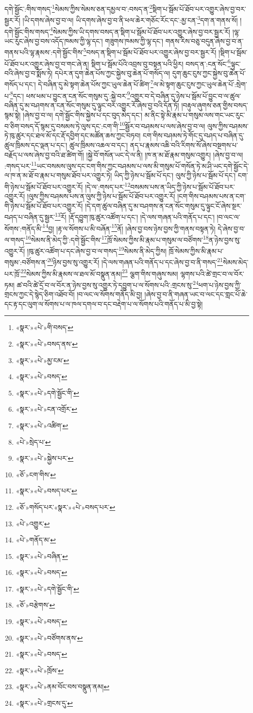 དགེ་སྦྱོང་:གིས་གསད་\footnote{«སྣར་»«པེ་»གི་བསད་}སེམས་ཀྱིས་སེམས་ཅན་དམྱལ་བ་:བསད་ན་\footnote{«སྣར་»«པེ་»བསད་ནས་}སྡིག་པ་སྦོམ་པོ་ཐོབ་པར་འགྱུར་ཞེས་བྱ་བར་སྦྱར་རོ། །ཡི་དགས་ཞེས་བྱ་བ་ལ། ཡི་དགས་ཞེས་བྱ་བ་ནི་ཕལ་ཆེར་གཅོང་རོང་དང་:མྱ་ངན་\footnote{«སྣར་»«པེ་»མྱ་ངམ་}དག་ན་གནས་སོ། །དགེ་སྦྱོང་གིས་གསད་\footnote{«སྣར་»«པེ་»བསད་}སེམས་ཀྱིས་ཡི་དགས་བསད་ན་སྡིག་པ་སྦོམ་པོ་ཐོབ་པར་འགྱུར་ཞེས་བྱ་བར་སྦྱར་རོ། །ལྷ་ཡང་རུང་ཞེས་བྱ་བས་འདོད་ཁམས་ཀྱི་ལྷ་དང་། གཟུགས་ཁམས་ཀྱི་ལྷ་དང་། གནས་རིས་བཅུ་བདུན་ཞེས་བྱ་བ་ན་གནས་པའི་ལྷ་རྣམས་:དགེ་སྦྱོང་གིས་\footnote{«སྣར་»«པེ་»དགེ་སྦྱོང་གི་}བསད་ན་སྡིག་པ་སྦོམ་པོ་ཐོབ་པར་འགྱུར་ཞེས་བྱ་བར་སྦྱར་རོ། །སྡིག་པ་སྦོམ་པོ་ཐོབ་པར་འགྱུར་ཞེས་བྱ་བ་གང་ཞེ་ན། སྡིག་པ་སྦོམ་པོའི་འབྲས་བུ་བསྟན་པའི་ཕྱིར། བསད་ན་:ངན་སོང་\footnote{«སྣར་»«པེ་»ངན་འགྲོར་}ལྟུང་བའི་ཞེས་བྱ་བ་སྨོས་ཏེ། དཔེར་ན་དུག་ཆེན་པོས་ཀྱང་སྐྱེས་བུ་ཆེན་པོ་གསོད་ལ། དུག་ཆུང་ངུས་ཀྱང་སྐྱེས་བུ་ཆེན་པོ་གསོད་པ་དང་། དེ་བཞིན་དུ་མེ་སྟག་ཆེན་པོས་ཀྱང་ཡུལ་ཆེན་པོ་ཚིག་\footnote{«སྣར་»«པེ་»འཚིག་}ལ་མེ་སྟག་ཆུང་ངུས་ཀྱང་ཡུལ་ཆེན་པོ་:སྲེག་པ་\footnote{«པེ་»སྲེད་པ་}དང་། ཕས་ཕམ་པ་བྱུང་ན་ངན་སོང་གསུམ་དུ་:སྐྱེ་བར་\footnote{«སྣར་»«པེ་»སྐྱེས་པར་}འགྱུར་བ་དེ་བཞིན་དུ་ཉེས་པ་སྦོམ་པོ་བྱུང་བ་ལ་ཚུལ་བཞིན་དུ་མ་བཤགས་ན་ངན་སོང་གསུམ་དུ་ལྟུང་བར་འགྱུར་རོ་ཞེས་བྱ་བའི་དོན་ཏོ། །བརྟུལ་ཞུགས་ཅན་གྱིས་བསད་སྙམ་སྟེ། །ཞེས་བྱ་བ་ལ། དགེ་སྦྱོང་གིས་སྐྱེས་པ་དང་བུད་མེད་དང་། མ་ནིང་སྟེ་མི་རྣམ་པ་གསུམ་ལས་གང་ཡང་རུང་བ་ཅིག་བསད་དོ་སྙམ་དུ་བསམས་ཏེ་ལུས་དང་:ངག་གི་\footnote{«ཅོ་»ངག་གིས་}སྦྱོར་བ་བཤམས་པ་ལས་ཞེས་བྱ་བ་ལ། ལུས་ཀྱིས་བཤམས་ཏེ་ཁུ་ཚུར་དང་ཐལ་མོ་དང་རྡོ་དབྱིག་དང་མཚོན་ཆས་ཀྱང་བཏབ། ངག་གིས་བཤམས་ཏེ་གོང་དུ་བཤད་པ་བཞིན་དུ་ཚུལ་ཁྲིམས་དང་ལྡན་པ་དང་། ཚུལ་ཁྲིམས་འཆལ་བ་དང་། ནད་པ་རྣམས་འཆི་བའི་རིགས་སོ་ཞེས་བསྔགས་པ་བརྗོད་པ་ལས་ཞེས་བྱ་བའི་ཐ་ཚིག་གོ། །སྐྱེ་བོ་གསོན་ཡང་དེ་ལ་ནི། །ཁ་ན་མ་ཐོ་རྣམ་གསུམ་འགྱུར། །ཞེས་བྱ་བ་ལ། :གསད་པར་\footnote{«སྣར་»«པེ་»བསད་པར་}ཡང་བསམས་ལུས་དང་ངག་གིས་ཀྱང་བཤམས་པ་ལས་མི་གསུམ་པོ་གསོན་ཏེ་མ་ཤི་ཡང་དགེ་སྦྱོང་དེ་ལ་ཁ་ན་མ་ཐོ་བ་རྣམ་པ་གསུམ་ཐོབ་པར་འགྱུར་ཏེ། ཡིད་ཀྱི་ཉེས་པ་སྦོམ་པོ་དང་། ལུས་ཀྱི་ཉེས་པ་སྦོམ་པོ་དང་། ངག་གི་ཉེས་པ་སྦོམ་པོ་ཐོབ་པར་འགྱུར་རོ། །དེ་ལ་:གསད་པར་\footnote{«ཅོ་»གསོད་པར་«སྣར་»«པེ་»བསད་པར་}བསམས་པས་ན་ཡིད་ཀྱི་ཉེས་པ་སྦོམ་པོ་ཐོབ་པར་འགྱུར་རོ། །ལུས་ཀྱིས་བཤམས་པས་ན་ལུས་ཀྱི་ཉེས་པ་སྦོམ་པོ་ཐོབ་པར་འགྱུར་རོ། །ངག་གིས་བཤམས་པས་ན་ངག་གི་ཉེས་པ་སྦོམ་པོ་ཐོབ་པར་འགྱུར་རོ། །དེ་དག་ཚུལ་བཞིན་དུ་མ་བཤགས་ན་ངན་སོང་གསུམ་དུ་ལྟུང་ངོ་ཞེས་སྔར་བཤད་པ་བཞིན་དུ་སྦྱར་\footnote{«པེ་»འགྱུར་}རོ། །རྡོ་དབྱུག་ཁུ་ཚུར་འཚོག་པ་དང་། །དེ་ལས་གཞན་པའི་གནོད་པ་དང་། །བ་ལང་ལ་སོགས་:གནོད་མི་\footnote{«པེ་»གནོད་མ་}བྱ། །རྟ་ལ་སོགས་པ་མི་བཞོན་\footnote{«སྣར་»«པེ་»བཞིན་}ནོ། །ཞེས་བྱ་བས་ཉེས་བྱས་ཀྱི་གནས་བསྟན་ཏེ། དེ་ཞེས་བྱ་བ་ལ་གསད་\footnote{«སྣར་»«པེ་»བསད་}སེམས་ནི་མེད་ཀྱི་:དགེ་སྦྱོང་གིས་\footnote{«སྣར་»«པེ་»དགེ་སྦྱོང་གི་}ཁྲོ་སེམས་ཀྱིས་མི་རྣམ་པ་གསུམ་ལ་བཙོགས་\footnote{«ཅོ་»བརྩེགས་}ན་ཉེས་བྱས་སུ་འགྱུར་རོ། །ཁུ་ཚུར་འཚོག་པ་དང་ཞེས་བྱ་བ་ལ་གསད་\footnote{«སྣར་»«པེ་»བསད་}སེམས་ནི་མེད་ཀྱིས། ཁྲོ་སེམས་ཀྱིས་མི་རྣམ་པ་གསུམ་:བཙོགས་ན་\footnote{«སྣར་»«པེ་»བཙོགས་ནས་}ཉེས་བྱས་སུ་འགྱུར་རོ། །དེ་ལས་གཞན་པའི་གནོད་པ་དང་ཞེས་བྱ་བ་ནི་གསད་\footnote{«སྣར་»«པེ་»བསད་}སེམས་མེད་པར་ཁྲོ་\footnote{«སྣར་»«པེ་»ཁྲོས་}སེམས་ཀྱིས་མི་རྣམས་ལ་ཐལ་མོ་བསྣུན་ནམ།\footnote{«སྣར་»«པེ་»ནམ་བོང་བས་བསྣུན་ནམ།} ལྕག་གིས་གཞུས་སམ། ལྷགས་པའི་ཚེ་གྲང་བ་ལ་བོར་ཏམ། ཚ་བའི་ཚེ་དྲོ་བ་ལ་བོར་ན་ཉེས་བྱས་སུ་འགྱུར་ཏེ་དབྱུག་པ་ལ་སོགས་པའི་:གྲངས་སུ་\footnote{«སྣར་»«པེ་»གྲངས་དུ་}ཕག་པ་ཉེས་བྱས་ཀྱི་གྲངས་ཀྱང་དེ་སྙེད་ཅིག་འཐོབ་བོ། །བ་ལང་ལ་སོགས་གནོད་མི་བྱ། །ཞེས་བྱ་བ་ནི་གཞན་ཡང་བ་ལང་དང་གླང་པོ་ཆེ་དང་རྟ་དང་ལུག་ལ་སོགས་པ་ལ་ཁལ་དགལ་བ་དང་བརྡེག་པ་ལ་སོགས་པའི་གནོད་པ་མི་བྱ་སྟེ། 